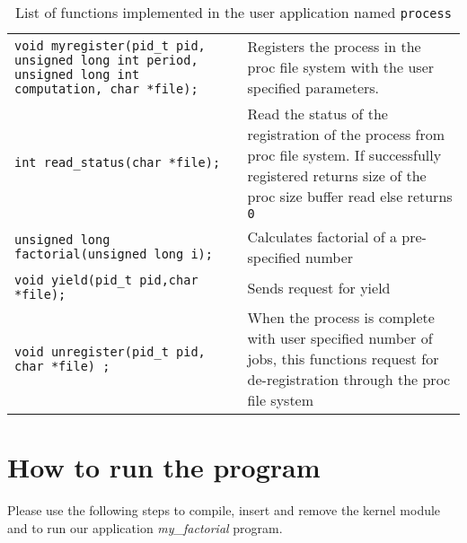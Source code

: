 \documentclass[11pt]{article}
\begin{document}
\begin{table*}[h]
	\centering
	\rcow
	\caption{List of functions implemented in the user application named {\tt process}\label{table:process}}
	\begin{tabular}{|p{7.5cm}|p{8cm}|}
		{\tt void myregister(pid\_t pid, unsigned long int period, unsigned long int computation, char *file);}  &  Registers the process in the proc file system with the user specified parameters.  \\
		{\tt int read\_status(char *file);}     & Read the status of the registration of the process from proc file system. If successfully registered returns size of the proc size buffer read else returns {\tt 0}  \\
		{\tt unsigned long factorial(unsigned long i);}&  Calculates factorial of a pre-specified number\\
		{\tt void yield(pid\_t pid,char *file);}&  Sends request for yield\\
		{\tt void unregister(pid\_t pid, char *file) ;}  & When the process is complete with user specified number of jobs, this functions request for de-registration through the proc file system \\
	\end{tabular}
\end{table*}

\section{How to run the program}\label{sec:toRun}

Please use the following steps to compile, insert and remove the kernel module and to run our application {\em my\_factorial } program.
\end{document}
